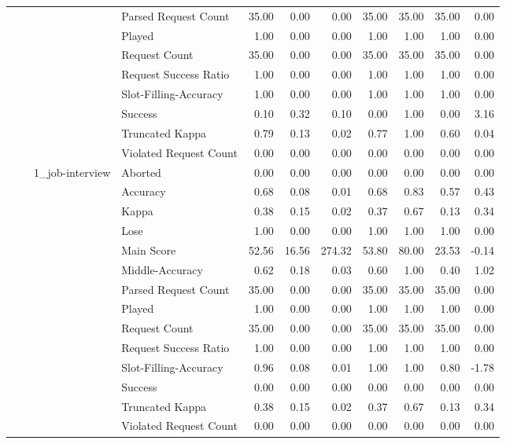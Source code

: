 \begin{tabular}{llllrrrrrrr}
 &  &  & Parsed Request Count & 35.00 & 0.00 & 0.00 & 35.00 & 35.00 & 35.00 & 0.00 \\
 &  &  & Played & 1.00 & 0.00 & 0.00 & 1.00 & 1.00 & 1.00 & 0.00 \\
 &  &  & Request Count & 35.00 & 0.00 & 0.00 & 35.00 & 35.00 & 35.00 & 0.00 \\
 &  &  & Request Success Ratio & 1.00 & 0.00 & 0.00 & 1.00 & 1.00 & 1.00 & 0.00 \\
 &  &  & Slot-Filling-Accuracy & 1.00 & 0.00 & 0.00 & 1.00 & 1.00 & 1.00 & 0.00 \\
 &  &  & Success & 0.10 & 0.32 & 0.10 & 0.00 & 1.00 & 0.00 & 3.16 \\
 &  &  & Truncated Kappa & 0.79 & 0.13 & 0.02 & 0.77 & 1.00 & 0.60 & 0.04 \\
 &  &  & Violated Request Count & 0.00 & 0.00 & 0.00 & 0.00 & 0.00 & 0.00 & 0.00 \\
\cline{3-11}
 &  & \multirow[t]{14}{*}{1_job-interview} & Aborted & 0.00 & 0.00 & 0.00 & 0.00 & 0.00 & 0.00 & 0.00 \\
 &  &  & Accuracy & 0.68 & 0.08 & 0.01 & 0.68 & 0.83 & 0.57 & 0.43 \\
 &  &  & Kappa & 0.38 & 0.15 & 0.02 & 0.37 & 0.67 & 0.13 & 0.34 \\
 &  &  & Lose & 1.00 & 0.00 & 0.00 & 1.00 & 1.00 & 1.00 & 0.00 \\
 &  &  & Main Score & 52.56 & 16.56 & 274.32 & 53.80 & 80.00 & 23.53 & -0.14 \\
 &  &  & Middle-Accuracy & 0.62 & 0.18 & 0.03 & 0.60 & 1.00 & 0.40 & 1.02 \\
 &  &  & Parsed Request Count & 35.00 & 0.00 & 0.00 & 35.00 & 35.00 & 35.00 & 0.00 \\
 &  &  & Played & 1.00 & 0.00 & 0.00 & 1.00 & 1.00 & 1.00 & 0.00 \\
 &  &  & Request Count & 35.00 & 0.00 & 0.00 & 35.00 & 35.00 & 35.00 & 0.00 \\
 &  &  & Request Success Ratio & 1.00 & 0.00 & 0.00 & 1.00 & 1.00 & 1.00 & 0.00 \\
 &  &  & Slot-Filling-Accuracy & 0.96 & 0.08 & 0.01 & 1.00 & 1.00 & 0.80 & -1.78 \\
 &  &  & Success & 0.00 & 0.00 & 0.00 & 0.00 & 0.00 & 0.00 & 0.00 \\
 &  &  & Truncated Kappa & 0.38 & 0.15 & 0.02 & 0.37 & 0.67 & 0.13 & 0.34 \\
 &  &  & Violated Request Count & 0.00 & 0.00 & 0.00 & 0.00 & 0.00 & 0.00 & 0.00 \\

\end{tabular}
